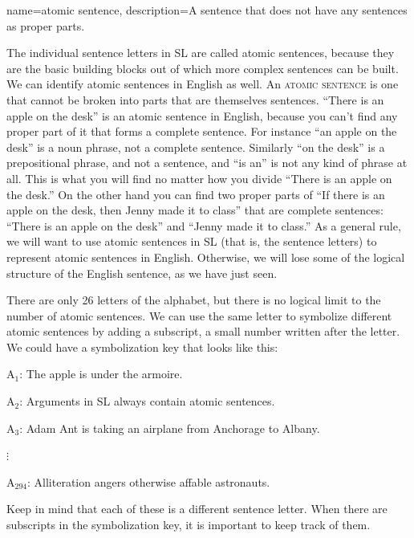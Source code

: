 {
name=atomic sentence,
description={A sentence that does not have any sentences as proper parts.}
}

The individual sentence letters in SL are called atomic sentences, because they are the basic building blocks out of which more complex sentences can be built. We can identify atomic sentences in English as well. An \textsc{\gls{atomic sentence}} \label{def:atomic_sentence} is one that cannot be broken into parts that are themselves sentences. ``There is an apple on the desk'' is an atomic sentence in English, because you can't find any proper part of it that forms a complete sentence. For instance ``an apple on the desk'' is a noun phrase, not a complete sentence. Similarly ``on the desk'' is a prepositional phrase, and not a sentence, and ``is an'' is not any kind of phrase at all. This is what you will find no matter how you divide ``There is an apple on the desk.'' On the other hand you can find two proper parts of ``If there is an apple on the desk, then Jenny made it to class'' that are complete sentences: ``There is an apple on the desk'' and ``Jenny made it to class.'' As a general rule, we will want to use atomic sentences in SL (that is, the sentence letters) to represent atomic sentences in English. Otherwise, we will lose some of the logical structure of the English sentence, as we have just seen.

There are only 26 letters of the alphabet, but there is no logical limit to the number of atomic sentences. We can use the same letter to symbolize different atomic sentences by adding a subscript, a small number written after the letter. We could have a symbolization key that looks like this:
\begin{ekey}
\item[A$_1$:] The apple is under the armoire.
\item[A$_2$:] Arguments in SL always contain atomic sentences.
\item[A$_3$:] Adam Ant is taking an airplane from Anchorage to Albany.
\item[$\vdots$]
\item[A$_{294}$:] Alliteration angers otherwise affable astronauts.
\end{ekey}
Keep in mind that each of these is a different sentence letter. When there are subscripts in the symbolization key, it is important to keep track of them.



